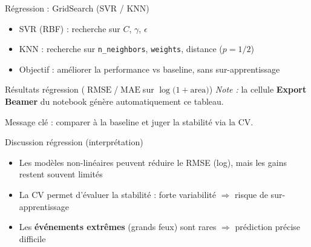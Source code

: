 \documentclass[aspectratio=169,11pt]{beamer}
\newcommand{\Area}{\ensuremath{\mathrm{area}}}
\newcommand{\LogArea}{\ensuremath{\log\!\bigl(1+\Area\bigr)}}
\DeclareRobustCommand{\RMSE}{\ensuremath{\operatorname{RMSE}}}
\DeclareRobustCommand{\MAE}{\ensuremath{\operatorname{MAE}}}
\begin{document}
\begin{frame}{R\'egression : GridSearch (SVR / KNN)}
  \begin{itemize}
    \item SVR (RBF) : recherche sur \(C\), \(\gamma\), \(\epsilon\)
    \item KNN : recherche sur \texttt{n\_neighbors}, \texttt{weights}, distance (\(p=1/2\))
    \item Objectif : am\'eliorer la performance vs baseline, sans sur-apprentissage
  \end{itemize}
\end{frame}

\begin{frame}{R\'esultats r\'egression (\RMSE/\MAE sur \(\LogArea\))}
  \textit{Note :} la cellule \textbf{Export Beamer} du notebook g\'en\`ere automatiquement ce tableau.

  \vspace{0.6em}
  \begin{table}
    \centering
    \small
  \end{table}

  \vspace{0.2em}
  Message cl\'e : comparer \`a la baseline et juger la stabilit\'e via la CV.
\end{frame}

\begin{frame}{Discussion r\'egression (interpr\'etation)}
  \begin{itemize}
    \item Les mod\`eles non-lin\'eaires peuvent r\'eduire le RMSE (log), mais les gains restent souvent limit\'es
    \item La CV permet d'\'evaluer la stabilit\'e : forte variabilit\'e \(\Rightarrow\) risque de sur-apprentissage
    \item Les \textbf{\'ev\'enements extr\^emes} (grands feux) sont rares \(\Rightarrow\) pr\'ediction pr\'ecise difficile
  \end{itemize}
\end{frame}
\end{document}
